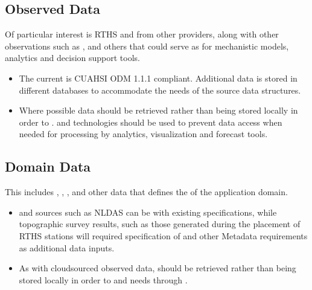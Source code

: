\documentclass[letterpaper,10pt,english]{sphinxmanual}
\begin{document}
\subsection{Observed Data}
\label{\detokenize{requirements/data/observed:observed-data}}\label{\detokenize{requirements/data/observed::doc}}
\sphinxAtStartPar
Of particular interest is RTHS and  from other providers, along with other observations such as ,  and others that could serve as  for mechanistic models, analytics and decision support tools.
\begin{itemize}
\item {} 
\sphinxAtStartPar
The current  is CUAHSI ODM 1.1.1 compliant. Additional data is stored in different databases to accommodate the needs of the source data structures.

\item {} 
\sphinxAtStartPar
Where possible  data should be retrieved  rather than being stored locally in order to .  and  technologies should be used to prevent data access  when needed for processing by analytics, visualization and forecast tools.

\end{itemize}


\subsection{Domain Data}
\label{\detokenize{requirements/data/domain:domain-data}}\label{\detokenize{requirements/data/domain::doc}}
\sphinxAtStartPar
This includes , , ,
 and other data that defines the  of the
application domain.
\begin{itemize}
\item {} 
\sphinxAtStartPar
{} and  sources such as NLDAS can be  with existing  specifications, while topographic survey results, such as those generated during the placement of RTHS stations will required specification of  and other Metadata requirements as additional data inputs.

\item {} 
\sphinxAtStartPar
As with cloud\sphinxhyphen{}sourced observed data,  should be retrieved  rather than being stored locally in order to  and  needs through .

\end{itemize}
\end{document}
